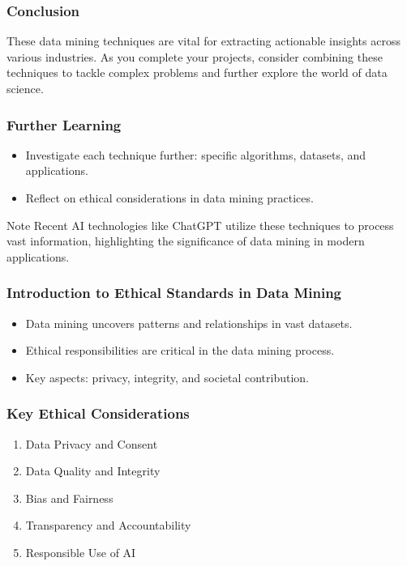 \documentclass[aspectratio=169]{beamer}
\begin{document}
\begin{frame}[fragile]
    \frametitle{Conclusion}
    These data mining techniques are vital for extracting actionable insights across various industries. 
    As you complete your projects, consider combining these techniques to tackle complex problems 
    and further explore the world of data science.
\end{frame}

\begin{frame}[fragile]
    \frametitle{Further Learning}
    \begin{itemize}
        \item Investigate each technique further: specific algorithms, datasets, and applications.
        \item Reflect on ethical considerations in data mining practices.
    \end{itemize}
    \begin{block}{Note}
        Recent AI technologies like ChatGPT utilize these techniques to process vast information, 
        highlighting the significance of data mining in modern applications.
    \end{block}
\end{frame}

\begin{frame}[fragile]
    \frametitle{Introduction to Ethical Standards in Data Mining}
    \begin{itemize}
        \item Data mining uncovers patterns and relationships in vast datasets.
        \item Ethical responsibilities are critical in the data mining process.
        \item Key aspects: privacy, integrity, and societal contribution.
    \end{itemize}
\end{frame}

\begin{frame}[fragile]
    \frametitle{Key Ethical Considerations}
    \begin{enumerate}
        \item Data Privacy and Consent
        \item Data Quality and Integrity
        \item Bias and Fairness
        \item Transparency and Accountability
        \item Responsible Use of AI
    \end{enumerate}
\end{frame}
\end{document}
